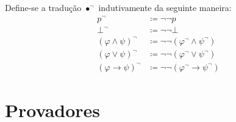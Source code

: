 \begin{definition}[$\bullet^\neg$] Define-se a tradução $\bullet^\neg$ indutivamente da seguinte maneira:
    \begin{align*}
        p^\neg&\coloneqq\neg\neg p\\
        \bot^\neg&\coloneqq\neg\neg\bot\\
        {(\varphi\wedge\psi)}^\neg&\coloneqq\neg\neg(\varphi^\neg \wedge \psi^\neg)\\
        {(\varphi\vee\psi)}^\neg&\coloneqq\neg\neg (\varphi^\neg \vee \psi^\neg)\\
        {(\varphi\to\psi)}^\neg&\coloneqq\neg\neg (\varphi^\neg \to \psi^\neg)
        \tag*{\qed} 
    \end{align*}
\end{definition}

\section{Provadores}
